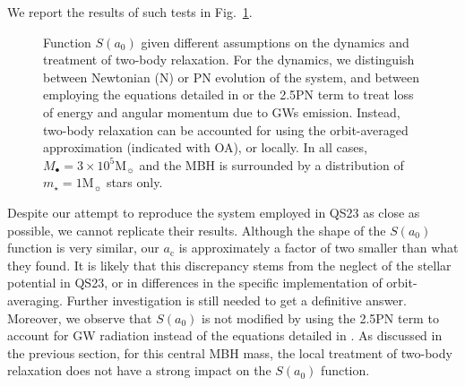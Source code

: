 \documentclass[desactivate]{aa}
\begin{document}
        We report the results of such tests in Fig.\ \ref{fig:params}.
        \begin{figure}
            \centering
            \caption{Function $S(a_0)$ given different assumptions on the dynamics and treatment of two-body relaxation. For the dynamics, we distinguish between Newtonian (N) or PN evolution of the system, and between employing the equations detailed in \citet{1964PhRv..136.1224P} or the 2.5PN term to treat loss of energy and angular momentum due to GWs emission. Instead, two-body relaxation can be accounted for using the orbit-averaged approximation (indicated with OA), or locally. In all cases, $M_\bullet = 3 \times 10^5 \mathrm{M}_\sun$ and the MBH is surrounded by a distribution of $m_\star = 1 \mathrm{M}_\sun$ stars only.}
            \label{fig:params}
        \end{figure}
        Despite our attempt to reproduce the system employed in QS23 as close as possible, we cannot replicate their results. Although the shape of the $S(a_0)$ function is very similar, our $a_\mathrm{c}$ is approximately a factor of two smaller than what they found. It is likely that this discrepancy stems from the neglect of the stellar potential in QS23, or in differences in the specific implementation of orbit-averaging. Further investigation is still needed to get a definitive answer. Moreover, we observe that $S(a_0)$ is not modified by using the 2.5PN term to account for GW radiation instead of the equations detailed in \citet{1964PhRv..136.1224P}. As discussed in the previous section, for this central MBH mass, the local treatment of two-body relaxation does not have a strong impact on the $S(a_0)$ function. 
\end{document}
